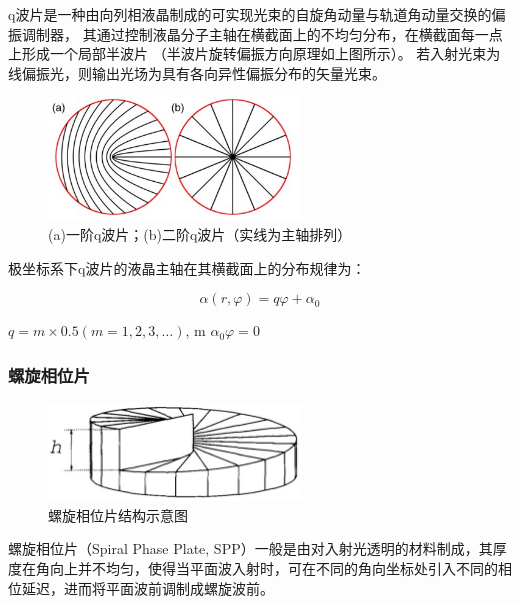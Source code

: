 \documentclass[a4paper,UTF8]{ctexart}
\begin{document}
q波片是一种由向列相液晶制成的可实现光束的自旋角动量与轨道角动量交换的偏振调制器，
其通过控制液晶分子主轴在横截面上的不均匀分布，在横截面每一点上形成一个局部半波片
（半波片旋转偏振方向原理如上图所示）。
若入射光束为线偏振光，则输出光场为具有各向异性偏振分布的矢量光束。

\begin{figure}[H]
    \centering
    \begin{minipage}[b]{0.9\textwidth}
        \centering
        \includegraphics[width=0.6\textwidth]{./fig5.jpg}
        \caption{(a)一阶q波片；(b)二阶q波片（实线为主轴排列）}
    \end{minipage}
\end{figure}

极坐标系下q波片的液晶主轴在其横截面上的分布规律为：

\begin{equation}\alpha(r,\varphi)=q\varphi+\alpha_0\end{equation}

$q=m\times 0.5(m=1,2,3,\dots)$, m $\alpha_0$$\varphi=0$

\subsubsection{螺旋相位片}

\begin{figure}[H]
    \centering
    \begin{minipage}[b]{0.9\textwidth}
        \centering
        \includegraphics[width=0.6\textwidth]{./fig6.jpg}
        \caption{螺旋相位片结构示意图}
    \end{minipage}
\end{figure}

螺旋相位片（Spiral Phase Plate, SPP）一般是由对入射光透明的材料制成，其厚度在角向上并不均匀，使得当平面波入射时，可在不同的角向坐标处引入不同的相位延迟，进而将平面波前调制成螺旋波前。
\end{document}
